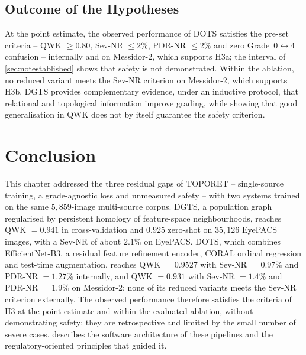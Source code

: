 \subsection{Outcome of the Hypotheses}

At the point estimate, the observed performance of DOTS satisfies the pre-set criteria --
QWK $\geq0.80$, Sev-NR $\leq2\%$, PDR-NR $\leq2\%$ and zero Grade~$0\leftrightarrow4$
confusion -- internally and on Messidor-2, which supports H3a; the interval of
\cref{sec:notestablished} shows that safety is not demonstrated. Within the ablation, no
reduced variant meets the Sev-NR criterion on Messidor-2, which supports H3b. DGTS
provides complementary evidence, under an inductive protocol, that relational and topological
information improve grading, while showing that good
generalisation in QWK does not by itself guarantee the safety criterion.

\section*{Conclusion}

This chapter addressed the three residual gaps of TOPORET -- single-source training, a
grade-agnostic loss and unmeasured safety -- with two systems trained on the same
$5{,}859$-image multi-source corpus. DGTS, a population graph regularised by persistent
homology of feature-space neighbourhoods, reaches QWK $=0.941$ in cross-validation and
$0.925$ zero-shot on $35{,}126$ EyePACS images, with a Sev-NR of about $2.1\%$ on EyePACS.
DOTS, which combines EfficientNet-B3, a residual feature refinement encoder, CORAL ordinal
regression and test-time augmentation, reaches QWK $=0.9527$ with Sev-NR $=0.97\%$ and
PDR-NR $=1.27\%$ internally, and QWK $=0.931$ with Sev-NR $=1.4\%$ and PDR-NR $=1.9\%$ on
Messidor-2; none of its reduced variants meets the Sev-NR criterion externally. The
observed performance therefore satisfies the criteria of H3 at the point estimate and
within the evaluated ablation, without demonstrating safety; they are
retrospective and limited by the small number of severe cases.  describes the
software architecture of these pipelines and the regulatory-oriented principles that
guided it.
